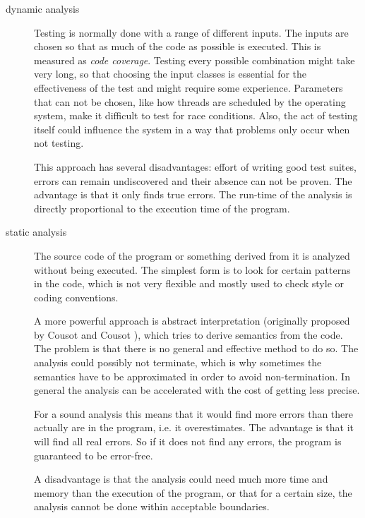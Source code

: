 \begin{description}
 \item[dynamic analysis]
Testing is normally done with a range of different inputs. The inputs are chosen so that as much of the code as possible is executed. This is measured as \textit{code coverage}. Testing every possible combination might take very long, so that choosing the input classes is essential for the effectiveness of the test and might require some experience. Parameters that can not be chosen, like how threads are scheduled by the operating system, make it difficult to test for race conditions. Also, the act of testing itself could influence the system in a way that problems only occur when not testing.

This approach has several disadvantages: effort of writing good test suites, errors can remain undiscovered and their absence can not be proven. The advantage is that it only finds true errors.
The run-time of the analysis is directly proportional to the execution time of the program.

\item[static analysis]
The source code of the program or something derived from it is analyzed without being executed.
The simplest form is to look for certain patterns in the code, which is not very flexible and mostly used to check style or coding conventions.

A more powerful approach is abstract interpretation (originally proposed by Cousot and Cousot \cite{Cousot:1977:AIU:512950.512973}), which tries to derive semantics from the code.
The problem is that there is no general and effective method to do so. The analysis could possibly not terminate, which is why sometimes the semantics have to be approximated in order to avoid non-termination. In general the analysis can be accelerated with the cost of getting less precise.

For a sound analysis this means that it would find more errors than there actually are in the program, i.e. it overestimates. The advantage is that it will find all real errors. So if it does not find any errors, the program is guaranteed to be error-free.

A disadvantage is that the analysis could need much more time and memory than the execution of the program, or that for a certain size, the analysis cannot be done within acceptable boundaries.
\end{description}


